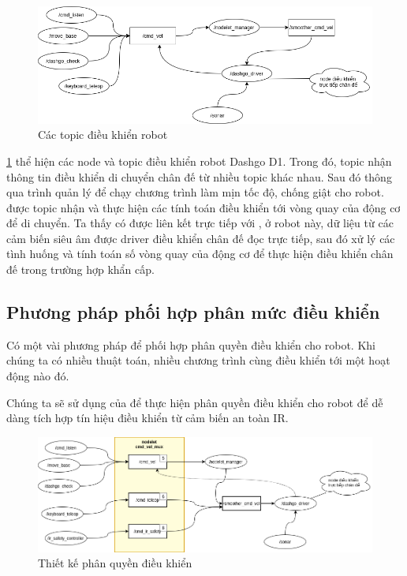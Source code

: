 {\begin{figure}[htbp]
    \centering
    \includegraphics[width=\linewidth]{figures/phanquyen-goc.png}
    \caption{Các topic điều khiển robot}
    \label{fig:phanquyen-goc}
\end{figure}

\figurename{\ref{fig:phanquyen-goc}} thể hiện các node và topic điều khiển robot Dashgo D1. Trong đó, topic  nhận thông tin điều khiển di chuyển chân đế từ nhiều topic khác nhau. Sau đó thông qua trình quản lý  để chạy chương trình làm mịn tốc độ, chống giật cho robot.  được topic  nhận và thực hiện các tính toán điều khiển tới vòng quay của động cơ để di chuyển.
Ta thấy có  được liên kết trực tiếp với , ở robot này, dữ liệu từ các cảm biến siêu âm được driver điều khiển chân đế đọc trực tiếp, sau đó xử lý các tình huống và tính toán số vòng quay của động cơ để thực hiện điều khiển chân đế trong trường hợp khẩn cấp.

\subsection{Phương pháp phối hợp phân mức điều khiển}
Có một vài phương pháp để phối hợp phân quyền điều khiển cho robot. Khi chúng ta có nhiều thuật toán, nhiều chương trình cùng điều khiển tới một hoạt động nào đó.

Chúng ta sẽ sử dụng  của  để thực hiện phân quyền điều khiển cho robot để dễ dàng tích hợp tín hiệu điều khiển từ cảm biến an toàn IR.

\begin{figure}[htbp]
    \centering
    \includegraphics[width=\linewidth]{figures/phanquen-dexuat.png}
    \caption{Thiết kế phân quyền điều khiển}
    \label{fig:phanquen-dexuat}
\end{figure}

}
